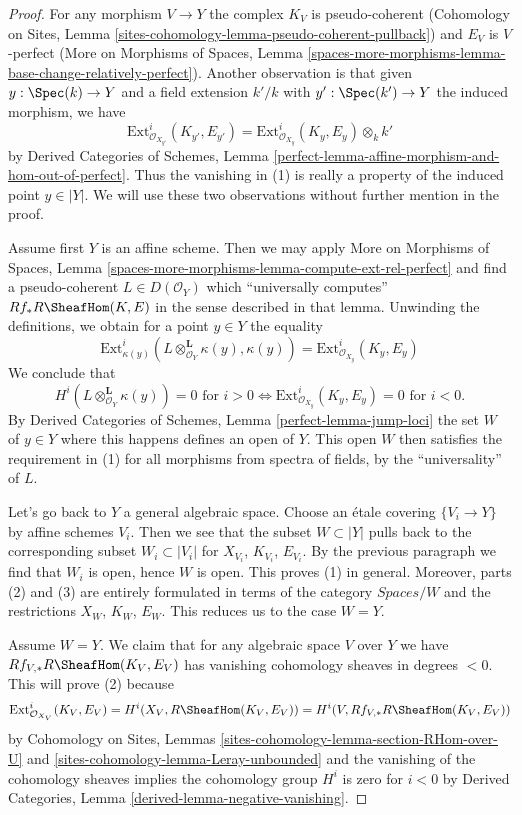 \begin{proof}
For any morphism $V \to Y$ the complex $K_V$ is pseudo-coherent
(Cohomology on Sites, Lemma
\ref{sites-cohomology-lemma-pseudo-coherent-pullback})
and $E_V$ is $V$-perfect (More on Morphisms of Spaces, Lemma
\ref{spaces-more-morphisms-lemma-base-change-relatively-perfect}).
Another observation is that given $y : \Spec(k) \to Y$
and a field extension $k'/k$ with $y' : \Spec(k') \to Y$
the induced morphism, we have
$$
\text{Ext}^i_{\mathcal{O}_{X_{y'}}}(K_{y'}, E_{y'}) =
\text{Ext}^i_{\mathcal{O}_{X_y}}(K_y, E_y) \otimes_k k'
$$
by Derived Categories of Schemes, Lemma
\ref{perfect-lemma-affine-morphism-and-hom-out-of-perfect}.
Thus the vanishing in (1) is really a property of the induced
point $y \in |Y|$.
We will use these two observations without further mention in the proof.

\medskip\noindent
Assume first $Y$ is an affine scheme. Then we may apply
More on Morphisms of Spaces, Lemma
\ref{spaces-more-morphisms-lemma-compute-ext-rel-perfect}
and find a pseudo-coherent $L \in D(\mathcal{O}_Y)$ which
``universally computes'' $Rf_*R\SheafHom(K, E)$ in the sense
described in that lemma. Unwinding the definitions, we obtain
for a point $y \in Y$ the equality
$$
\text{Ext}^i_{\kappa(y)}(L \otimes_{\mathcal{O}_Y}^\mathbf{L} \kappa(y),
\kappa(y)) = \text{Ext}^i_{\mathcal{O}_{X_y}}(K_y, E_y)
$$
We conclude that
$$
H^i(L \otimes_{\mathcal{O}_Y}^\mathbf{L} \kappa(y)) = 0
\text{ for } i > 0 \Leftrightarrow
\text{Ext}^i_{\mathcal{O}_{X_y}}(K_y, E_y) = 0 \text{ for }i < 0.
$$
By Derived Categories of Schemes, Lemma \ref{perfect-lemma-jump-loci}
the set $W$ of $y \in Y$ where this happens defines an open of $Y$.
This open $W$ then satisfies the requirement in (1) for all morphisms
from spectra of fields, by the ``universality'' of $L$.

\medskip\noindent
Let's go back to $Y$ a general algebraic space.
Choose an \'etale covering $\{V_i \to Y\}$ by affine schemes $V_i$.
Then we see that the subset $W \subset |Y|$ pulls back to the corresponding
subset $W_i \subset |V_i|$ for $X_{V_i}$, $K_{V_i}$, $E_{V_i}$.
By the previous paragraph we find that $W_i$ is open, hence $W$ is open.
This proves (1) in general. Moreover, parts (2) and (3) are entirely formulated
in terms of the category $\textit{Spaces}/W$ and the restrictions
$X_W$, $K_W$, $E_W$. This reduces us to the case $W = Y$.

\medskip\noindent
Assume $W = Y$. We claim that for any algebraic space $V$ over $Y$
we have $Rf_{V, *}R\SheafHom(K_V, E_V)$ has vanishing cohomology
sheaves in degrees $< 0$. This will prove (2) because
$$
\text{Ext}^i_{\mathcal{O}_{X_V}}(K_V, E_V) =
H^i(X_V, R\SheafHom(K_V, E_V)) = 
H^i(V, Rf_{V, *}R\SheafHom(K_V, E_V))
$$
by Cohomology on Sites, Lemmas
\ref{sites-cohomology-lemma-section-RHom-over-U} and
\ref{sites-cohomology-lemma-Leray-unbounded}
and the vanishing of the cohomology sheaves implies the
cohomology group $H^i$ is zero for $i < 0$ by
Derived Categories, Lemma \ref{derived-lemma-negative-vanishing}.


\end{proof}
